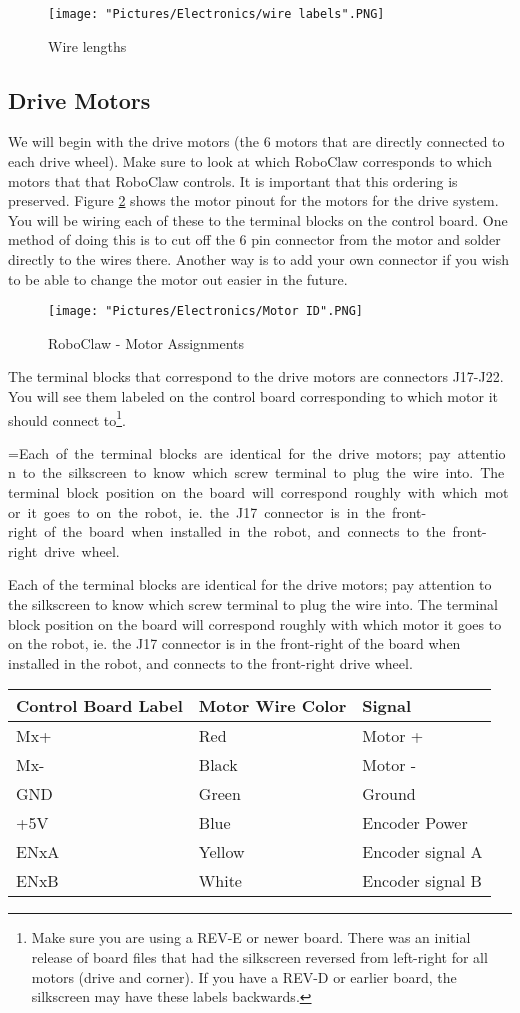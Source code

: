 \documentclass{article}
\makeatletter
\newcommand{\mybox}[1]{%
  \setbox0=\hbox{#1}%
  \setlength{\@tempdima}{\dimexpr\wd0+13pt}%
  \begin{tcolorbox}[colframe=mycolor,boxrule=0.5pt,arc=4pt,
      left=6pt,right=6pt,top=6pt,bottom=6pt,boxsep=0pt,width=0.95\textwidth]
    #1
  \end{tcolorbox}
}
\makeatother
\begin{document}
\begin{figure}[H]
 	\centering
	\texttt{[image: "Pictures/Electronics/wire labels".PNG]}
 	\caption{Wire lengths}
	\label{wire lengths}
\end{figure}

\subsection{Drive Motors}
We will begin with the drive motors (the 6 motors that are directly connected to each drive wheel). Make sure to look at which RoboClaw corresponds to which motors that that RoboClaw controls. It is important that this ordering is preserved. Figure \ref{motorID} shows the motor pinout for the motors for the drive system. You will be wiring each of these to the terminal blocks on the control board. One method of doing this is to cut off the 6 pin connector from the motor and solder directly to the wires there. Another way is to add your own connector if you wish to be able to change the motor out easier in the future.

\begin{figure}[H]
 	\centering
	\texttt{[image: "Pictures/Electronics/Motor ID".PNG]}
 	\caption{RoboClaw - Motor Assignments}
	\label{motorID}
\end{figure}

The terminal blocks that correspond to the drive motors are connectors J17-J22. You will see them labeled on the control board corresponding to which motor it should connect to\footnote{Make sure you are using a REV-E or newer board.  There was an initial release of board files that had the silkscreen reversed from left-right for all motors (drive and corner). If you have a REV-D or earlier board, the silkscreen may have these labels backwards.}.

\mybox{Each of the terminal blocks are identical for the drive motors; pay attention to the silkscreen to know which screw terminal to plug the wire into. The terminal block position on the board will correspond roughly with which motor it goes to on the robot, ie. the J17 connector is in the front-right of the board when installed in the robot, and connects to the front-right drive wheel. }

\begin{tabular}[3] {| l | l | l |}
	\hline
	\textbf{Control Board Label} & \textbf{Motor Wire Color} & \textbf{Signal} \\ \hline
	Mx+ & Red & Motor + \\ \hline
	Mx- & Black & Motor - \\ \hline
	GND & Green & Ground \\ \hline
	+5V & Blue & Encoder Power \\ \hline
	ENxA & Yellow & Encoder signal A \\ \hline
	ENxB & White & Encoder signal B \\ \hline
	\hline
\end{tabular}
\end{document}
